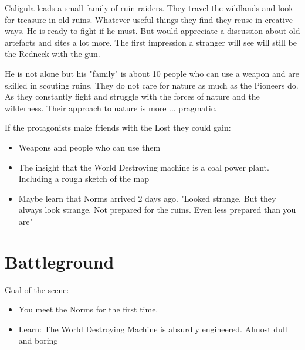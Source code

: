 \begin{npcBox}[title=Caligula]
    \begin{consequences}
    \item {}
    \item {}
    \item {}
    \end{consequences}
    
    \begin{npcDescription}
    Caligula leads a small family of ruin raiders. They travel the wildlands and look for treasure in old ruins. Whatever useful things they find they reuse in creative ways.
    He is ready to fight if he must. But would appreciate a discussion about old artefacts and sites a lot more. The first impression a stranger will see will still be the Redneck with the gun.
    \end{npcDescription}
    
    \end{npcBox}

He is not alone but his "family" is about 10 people who can use a weapon and are skilled in scouting ruins. They do not care for nature as much as the Pioneers do. As they constantly fight and struggle with the forces of nature and the wilderness. Their approach to nature is more ... pragmatic.

If the protagonists make friends with the Lost they could gain:

\begin{itemize}
    \item Weapons and people who can use them
    \item The insight that the World Destroying machine is a coal power plant. Including a rough sketch of the map
    \item Maybe learn that Norms arrived 2 days ago. "Looked strange. But they always look strange. Not prepared for the ruins. Even less prepared than you are"
\end{itemize}

\section{Battleground}

Goal of the scene:

\begin{itemize}
\item You meet the Norms for the first time.
\item Learn: The World Destroying Machine is absurdly engineered. Almost dull and boring
\end{itemize}

